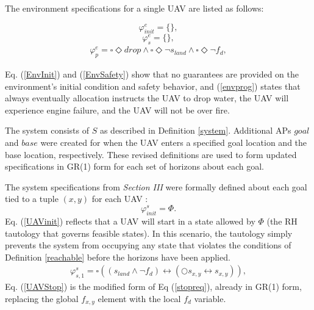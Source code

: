 \documentclass{ieeeaccess}
\newcommand{\always}{\square}
\newcommand{\eventually}{\Diamond}
\newcommand{\next}{\bigcirc}
\begin{document}
The environment specifications for a single UAV are listed as follows: 

\begin{equation}
\varphi_{init}^{e} = \{\},
\label{EnvInit}
\end{equation}
\begin{equation}
\varphi_{s}^{e} = \{\},
\label{EnvSafety}
\end{equation}
\begin{equation}
\begin{aligned}
\varphi_{p}^{e} = \always \eventually drop \land \always \eventually \lnot s_{land} \land \always \eventually \lnot f_d,
\end{aligned}
\label{envprog}
\end{equation}

Eq. (\ref{EnvInit}) and (\ref{EnvSafety}) show that no guarantees are provided on the environment's initial condition and safety behavior, and (\ref{envprog}) states that always eventually allocation instructs the UAV to drop water, the UAV will experience engine failure, and the UAV will not be over fire.

The system consists of $S$ as described in Definition \ref{system}. Additional APs $goal$ and $base$ were created for when the UAV enters a specified goal location and the base location, respectively. These revised definitions are used to form updated specifications in GR(1) form for each set of horizons about each goal.

The system specifications from \textit{Section III} were formally defined about each goal tied to a tuple $(x,y)$ for each UAV :
\begin{equation}
\varphi_{init}^{s} = \Phi.
\label{UAVinit}
\end{equation}
Eq. (\ref{UAVinit}) reflects that a UAV will start in a state allowed by $\Phi$ (the RH tautology that governs feasible states). In this scenario, the tautology simply prevents the system from occupying any state that violates the conditions of Definition \ref{reachable} before the horizons have been applied.
\begin{equation}
\begin{aligned}
\varphi_{s,1}^{s} = \always ((s_{land} \land \lnot f_d) \leftrightarrow (\next s_{x,y} \leftrightarrow s_{x,y})),
\end{aligned}
\label{UAVStop}
\end{equation}
Eq. (\ref{UAVStop}) is the modified form of Eq (\ref{stopreq}), already in GR(1) form, replacing the global $f_{x,y}$ element with the local $f_d$ variable.
\end{document}
